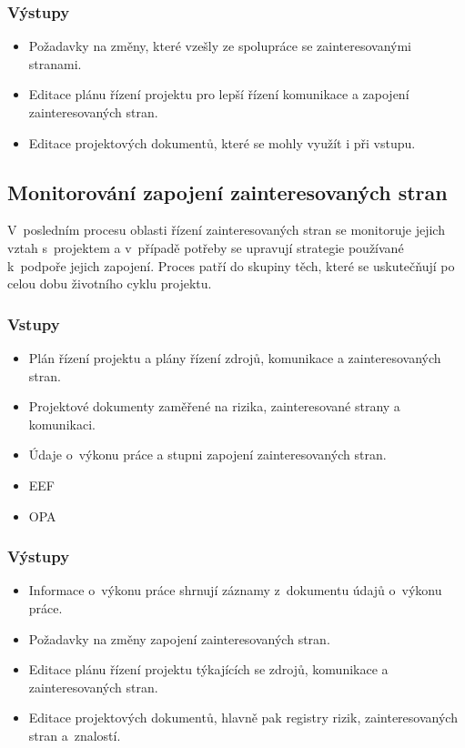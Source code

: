 \subsubsection*{Výstupy}
\begin{itemize}
    \item Požadavky na změny, které vzešly ze spolupráce se zainteresovanými stranami.
    \item Editace plánu řízení projektu pro lepší řízení komunikace a zapojení zainteresovaných stran.
    \item Editace projektových dokumentů, které se mohly využít i při vstupu.
\end{itemize}


\subsection*{Monitorování zapojení zainteresovaných stran}

V~posledním procesu oblasti řízení zainteresovaných stran se monitoruje jejich vztah s~projektem a v~případě potřeby se upravují strategie používané k~podpoře jejich zapojení. Proces patří do skupiny těch, které se uskutečňují po celou dobu životního cyklu projektu.

\subsubsection*{Vstupy}
\begin{itemize}
    \item Plán řízení projektu a plány řízení zdrojů, komunikace a zainteresovaných stran.
    \item Projektové dokumenty zaměřené na rizika, zainteresované strany a komunikaci.
    \item Údaje o~výkonu práce a stupni zapojení zainteresovaných stran.
    \item EEF
    \item OPA
\end{itemize}
\subsubsection*{Výstupy}
\begin{itemize}
    \item Informace o~výkonu práce shrnují záznamy z~dokumentu údajů o~výkonu práce.
    \item Požadavky na změny zapojení zainteresovaných stran.
    \item Editace plánu řízení projektu týkajících se zdrojů, komunikace a zainteresovaných stran.
    \item Editace projektových dokumentů, hlavně pak registry rizik, zainteresovaných stran a~znalostí.
\end{itemize}

